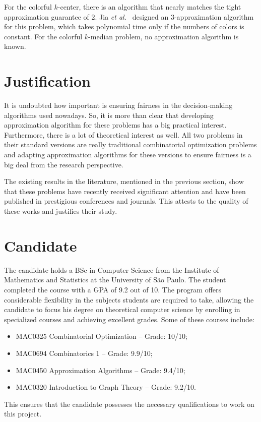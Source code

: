 \documentclass[12pt]{article}
\begin{document}
For the colorful $k$-center, there is an algorithm that nearly matches the tight approximation guarantee of 2. Jia \emph{et al.}~\cite{JSS2020} designed an 3-approximation algorithm for this problem, which takes polynomial time only if the numbers of colors is constant. For the colorful $k$-median problem, no approximation algorithm is known.

\section{Justification}
It is undoubted how important is ensuring fairness in the decision-making algorithms used nowadays. 
So, it is more than clear that developing approximation algorithm for these problems has a big practical interest. 
Furthermore, there is a lot of theoretical interest as well.
All two problems in their standard versions are really traditional combinatorial optimization problems and adapting approximation algorithms for these versions to ensure fairness is a big deal from the research perspective.

The existing results in the literature, mentioned in the previous section, show that these problems have recently received significant attention and have been published in prestigious conferences and journals. This attests to the quality of these works and justifies their study.


\section{Candidate}
The candidate holds a BSc in Computer Science from the Institute of Mathematics and Statistics at the University of São Paulo.
The student completed the course with a GPA of 9.2 out of 10. The program offers considerable flexibility in the subjects students are required to take, allowing the candidate to focus his degree on theoretical computer science by enrolling in specialized courses and achieving excellent grades. Some of these courses include:
\begin{itemize} 
    \item MAC0325 Combinatorial Optimization – Grade: 10/10; 
    \item MAC0694 Combinatorics 1 – Grade: 9.9/10; 
    \item MAC0450 Approximation Algorithms – Grade: 9.4/10; 
    \item MAC0320 Introduction to Graph Theory – Grade: 9.2/10. 
\end{itemize}
This ensures that the candidate possesses the necessary qualifications to work on this project.
\end{document}
